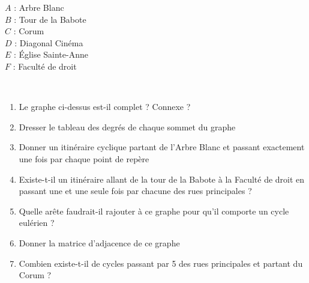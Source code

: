 \documentclass[oneside,12pt]{article}          %
\begin{document}
\hspace{3cm}
\begin{minipage}[c]{0.3\linewidth}
$A$ : Arbre Blanc \\
$B$ : Tour de la Babote \\
$C$ : Corum \\
$D$ : Diagonal Cinéma \\
$E$ : Église Sainte-Anne \\
$F$ : Faculté de droit
\end{minipage}
\begin{minipage}[c]{0.3\linewidth}
\end{minipage}\\[10pt]

\begin{enumerate}
    \item Le graphe ci-dessus est-il complet ? Connexe ?
    \item Dresser le tableau des degrés de chaque sommet du graphe
    \item Donner un itinéraire cyclique partant de l'Arbre Blanc et passant exactement une fois par chaque point de repère
    \item Existe-t-il un itinéraire allant de la tour de la Babote à la Faculté de droit en passant une et une seule fois par chacune des rues principales ?
    \item Quelle arête faudrait-il rajouter à ce graphe pour qu'il comporte un cycle eulérien ?
    \item Donner la matrice d'adjacence de ce graphe
    \item Combien existe-t-il de cycles passant par 5 des rues principales et partant du Corum ?
\end{enumerate}
\end{document}
